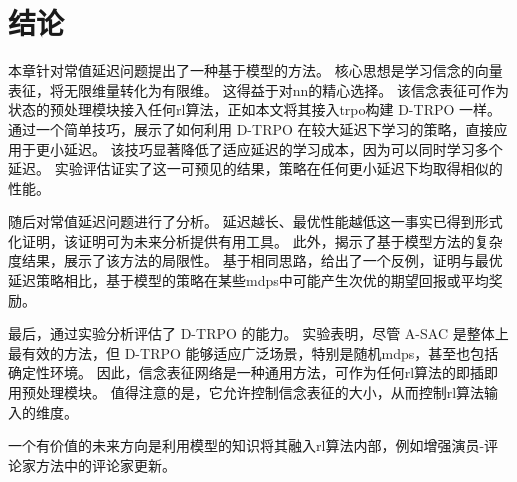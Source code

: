 \section{结论}

本章针对常值延迟问题提出了一种基于模型的方法。
核心思想是学习信念的向量表征，将无限维量转化为有限维。
这得益于对\gls{nn}的精心选择。
该信念表征可作为状态的预处理模块接入任何\gls{rl}算法，正如本文将其接入\gls{trpo}构建 D-TRPO 一样。
通过一个简单技巧，展示了如何利用 D-TRPO 在较大延迟下学习的策略，直接应用于更小延迟。
该技巧显著降低了适应延迟的学习成本，因为可以同时学习多个延迟。
实验评估证实了这一可预见的结果，策略在任何更小延迟下均取得相似的性能。

随后对常值延迟问题进行了分析。
延迟越长、最优性能越低这一事实已得到形式化证明，该证明可为未来分析提供有用工具。
此外，揭示了基于模型方法的复杂度结果，展示了该方法的局限性。
基于相同思路，给出了一个反例，证明与最优延迟策略相比，基于模型的策略在某些\glspl{mdp}中可能产生次优的期望回报或平均奖励。

最后，通过实验分析评估了 D-TRPO 的能力。
实验表明，尽管 A-SAC 是整体上最有效的方法，但 D-TRPO 能够适应广泛场景，特别是随机\glspl{mdp}，甚至也包括确定性环境。
因此，信念表征网络是一种通用方法，可作为任何\gls{rl}算法的即插即用预处理模块。
值得注意的是，它允许控制信念表征的大小，从而控制\gls{rl}算法输入的维度。

一个有价值的未来方向是利用模型的知识将其融入\gls{rl}算法内部，例如增强演员-评论家方法中的评论家更新。
